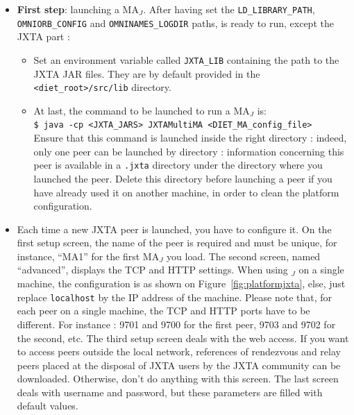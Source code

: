 \begin{itemize}

  \item{\textbf{First step}: launching a MA$_{J}$. After having set
      the \texttt{LD\_LIBRARY\_PATH}, \\ \texttt{OMNIORB\_CONFIG} and
      \texttt{OMNINAMES\_LOGDIR} paths, \diet is ready to run, except
      the JXTA part :}
    \begin{itemize}
      \item{Set an environment variable called \texttt{JXTA\_LIB}
      containing the path to the JXTA JAR files. They are by default
      provided in the \texttt{<diet\_root>/src/lib} directory.}

  \item{At last, the command to be launched to run a MA$_{J}$ is:\\
      \noindent
      {\footnotesize \texttt{\$ java -cp <JXTA\_JARS> JXTAMultiMA
          <DIET\_MA\_config\_file>} } \\Ensure that this command is
      launched inside the right directory : indeed, only one peer can
      be launched by directory : information concerning this peer is
      available in a \texttt{.jxta} directory under the directory
      where you launched the peer.  Delete this directory before
      launching a peer if you have already used it on another machine,
      in order to clean the platform configuration.}
    \end{itemize}
    
  \item{Each time a new JXTA peer is launched, you have to configure
      it.  On the first setup screen, the name of the peer is required
      and must be unique, for instance, ``MA1'' for the first MA$_{J}$
      you load. The second screen, named ``advanced'', displays the
      TCP and HTTP settings. When using \diet$_{J}$ on a single
      machine, the configuration is as shown on
      Figure~\ref{fig:platformjxta}, else, just replace \texttt{localhost}
      by the IP address of the machine.  Please note that, for each
      peer on a single machine, the TCP and HTTP ports have to be
      different. For instance : 9701 and 9700 for the first peer, 9703
      and 9702 for the second, etc. The third setup screen deals with
      the web access. If you want to access peers outside the local
      network, references of rendezvous and relay peers placed at the
      disposal of JXTA users by the JXTA community can be
      downloaded. Otherwise, don't do anything with this screen. The
      last screen deals with username and password, but these
      parameters are filled with default values.}


\end{itemize}
